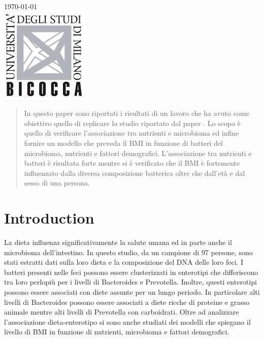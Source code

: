 \begin{titlepage}
{\large \today}\\[2cm] %


\includegraphics{figs/logo.png}\\[1cm] %
 

\vfill %

\end{titlepage}


\begin{abstract}
In questo paper sono riportati i risultati di un lavoro che ha avuto come obiettivo quello di replicare lo studio riportato dal paper \cite{paper}. Lo scopo è quello di verificare l'associazione tra nutrienti e microbioma ed infine fornire un modello che preveda il BMI in funzione di batteri del microbioma, nutrienti e fattori demografici. L'associazione tra nutrienti e batteri è risultata forte mentre si è verificato che il BMI è fortemente influenzato dalla diversa composizione batterica oltre che dall'età e dal sesso di una persona. 
\end{abstract}

\section{Introduction}
La dieta influenza significativamente la salute umana ed in parte anche il microbioma dell’intestino. In questo studio, da un campione di 97 persone, sono stati estratti dati sulla loro dieta e la composizione del DNA delle loro feci. I batteri presenti nelle feci possono essere clusterizzati in enterotipi che differiscono tra loro perlopiù per i livelli di Bacteroides e Prevotella. Inoltre, questi enterotipi possono essere associati con diete assunte per un lungo periodo. In particolare alti livelli di Bacteroides possono essere associati a diete ricche di proteine e grasso animale mentre alti livelli di Prevotella con carboidrati. 
Oltre ad analizzare l’associazione dieta-enterotipo si sono anche studiati dei modelli che spiegano il livello di BMI in funzione di nutrienti, microbioma e fattori demografici.

